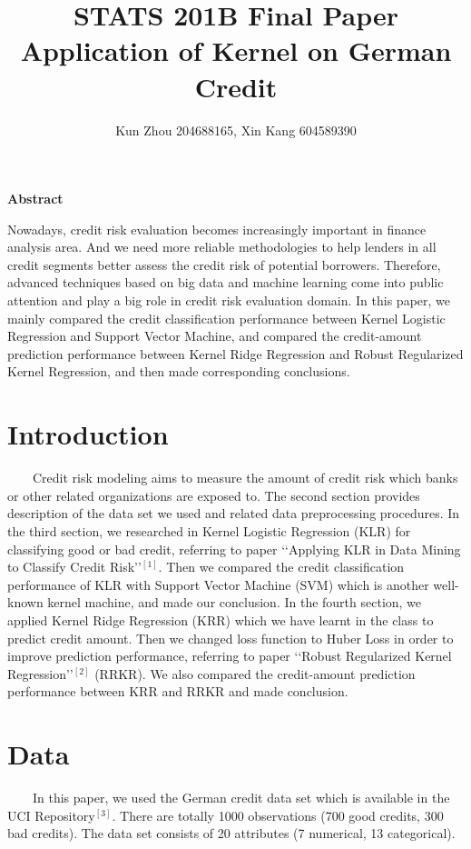 \documentclass[11pt, oneside]{article}   	%
\title{\textbf{STATS 201B Final Paper \\ Application of Kernel on German Credit}}
\author{Kun Zhou 204688165, Xin Kang 604589390}
\begin{document}
\maketitle
\begin{center}
\textbf{\Large{Abstract}}
\end{center}
\vspace{6pt}

Nowadays, credit risk evaluation becomes increasingly important in finance analysis area. And we need more reliable methodologies to help lenders in all credit segments better assess the credit risk of potential borrowers. Therefore, advanced techniques based on big data and machine learning come into public attention and play a big role in credit risk evaluation domain. In this paper, we mainly compared the credit classification performance between Kernel Logistic Regression and Support Vector Machine, and compared the credit-amount prediction performance between Kernel Ridge Regression and Robust Regularized Kernel Regression, and then made corresponding conclusions.

\vspace{6pt}
\section{Introduction}
~~~~Credit risk modeling aims to measure the amount of credit risk which banks or other related organizations are exposed to. The second section provides description of the data set we used and related data preprocessing procedures.  In the third section, we researched in Kernel Logistic Regression (KLR) for classifying good or bad credit, referring to paper \lq\lq Applying KLR in Data Mining to Classify Credit Risk\rq\rq$^{[1]}$. Then we compared the credit classification performance of KLR with Support Vector Machine (SVM) which is another well-known kernel machine, and made our conclusion. In the fourth section, we applied Kernel Ridge Regression (KRR) which we have learnt in the class to predict credit amount. Then we changed loss function to Huber Loss in order to improve prediction performance, referring to paper \lq\lq Robust Regularized Kernel Regression\rq\rq$^{[2]}$ (RRKR). We also compared the credit-amount prediction performance between KRR and RRKR and made conclusion.
\section{Data}
~~~~In this paper, we used the German credit data set which is available in the UCI Repository$^{[3]}$. There are totally 1000 observations (700 good credits, 300 bad credits). The data set consists of 20 attributes (7 numerical, 13 categorical).
\end{document}
